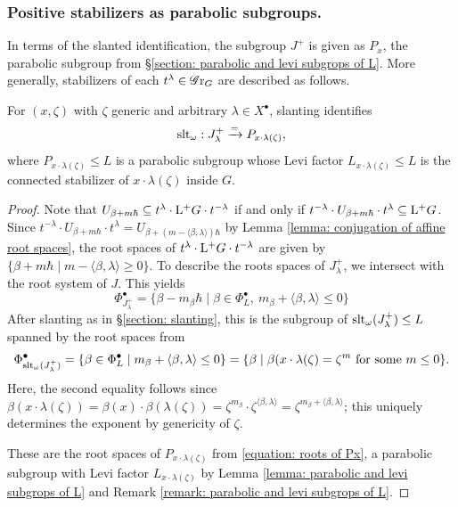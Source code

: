 \subsubsection{Positive stabilizers as parabolic subgroups.}
In terms of the slanted identification, the subgroup $J^+$ is given as $P_x$, the parabolic subgroup from \S \ref{section: parabolic and levi subgrops of L}. More generally, stabilizers of each $t^{\lambda} \in \operatorname{\mathscr{G}r}_G$ are described as follows.
\begin{lemma}\label{lemma: positive stabilizers as parabolics -- generic zeta}
For $(x, \zeta)$ with $\zeta$ generic and arbitrary $\lambda \in X^{\bullet}$, slanting identifies
\begin{equation*}
    \operatorname{slt}_{\omega}: J^{+}_{\lambda} \xrightarrow{=}  P_{x \cdot \lambda(\zeta)},
\end{equation*}   
where $P_{x \cdot \lambda(\zeta)} \leq L$ is a parabolic subgroup whose Levi factor $L_{x \cdot \lambda(\zeta)} \leq L$ is the connected stabilizer of $x \cdot \lambda(\zeta)$ inside $G$. 
\end{lemma}
\begin{proof}
Note that $U_{\beta + m\hbar} \subseteq t^{\lambda} \cdot \mathrm{L^+} G \cdot t^{-\lambda}$ if and only if $ t^{-\lambda} \cdot U_{\beta + m\hbar} \cdot t^{\lambda} \subseteq \mathrm{L^+} G$. Since $ t^{-\lambda} \cdot U_{\beta + m\hbar} \cdot t^{\lambda} = U_{\beta + (m - \langle \beta, \lambda \rangle)\hbar}$ by Lemma \ref{lemma: conjugation of affine root spaces}, the root spaces of $t^{\lambda} \cdot \mathrm{L^+} G \cdot t^{-\lambda}$ are given by
$\{ \beta + m\hbar \mid m - \langle \beta, \lambda \rangle \geq 0 \}$.
%
To describe the roots spaces of $J^{+}_{\lambda}$, we intersect with the root system of $J$. This yields
\begin{equation*}
    \Phi^{\bullet}_{J^{+}_{\lambda}} = \{ \beta - m_{\beta}\hbar \mid \beta \in \Phi^{\bullet}_L, \  m_{\beta} + \langle \beta, \lambda \rangle \leq 0 \}
\end{equation*}
After slanting as in \S \ref{section: slanting}, this is the subgroup of $\operatorname{slt}_{\omega}(J^{+}_{\lambda}) \leq L$ spanned by the root spaces from
\begin{equation*}
    \Phi^{\bullet}_{\operatorname{slt}_{\omega}(J^{+}_{\lambda})} = \{ \beta \in \Phi^{\bullet}_L \mid  m_{\beta} + \langle \beta, \lambda \rangle \leq 0 \} = \{ \beta \mid \beta(x \cdot \lambda(\zeta) = \zeta^m \ \text{for some} \ m \leq 0 \}.
\end{equation*}
Here, the second equality follows since $\beta(x \cdot \lambda(\zeta)) = \beta(x) \cdot \beta(\lambda(\zeta)) = \zeta^{m_{\beta}} \cdot \zeta^{\langle \beta, \lambda \rangle} = \zeta^{m_{\beta} + \langle \beta, \lambda \rangle}$; this uniquely determines the exponent by genericity of $\zeta$.

These are the root spaces of $P_{x \cdot \lambda(\zeta)}$ from \eqref{equation: roots of Px}, a parabolic subgroup with Levi factor $L_{x \cdot \lambda(\zeta)}$ by Lemma \ref{lemma: parabolic and levi subgrops of L} and Remark \ref{remark: parabolic and levi subgrops of L}.
\end{proof}

